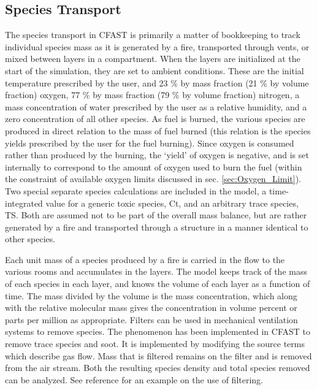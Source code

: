 \subsection{Species Transport}

The species transport in CFAST is primarily a matter of bookkeeping to track individual species mass as it is generated by a fire, transported through vents, or mixed between layers in a compartment.  When the layers are initialized at the start of the simulation, they are set to ambient conditions.  These are the initial temperature prescribed by the user, and 23 \% by mass fraction (21 \% by volume fraction) oxygen, 77 \% by mass fraction (79 \% by volume fraction) nitrogen, a mass concentration of water prescribed by the user as a relative humidity, and a zero concentration of all other species.  As fuel is burned, the various species are produced in direct relation to the mass of fuel burned (this relation is the species yields prescribed by the user for the fuel burning).  Since oxygen is consumed rather than produced by the burning, the `yield' of oxygen is negative, and is set internally to correspond to the amount of oxygen used to burn the fuel (within the constraint of available oxygen limits discussed in sec. \ref{sec:Oxygen_Limit}). Two special separate species calculations are included in the model, a time-integrated value for a generic toxic species, Ct, and an arbitrary trace species, TS.  Both are assumed not to be part of the overall mass balance, but are rather generated by a fire and transported through a structure in a manner identical to other species.

Each unit mass of a species produced by a fire is carried in the flow to the various rooms and accumulates in the layers.  The model keeps track of the mass of each species in each layer, and knows the volume of each layer as a function of time.  The mass divided by the volume is the mass concentration, which along with the relative molecular mass gives the concentration in volume percent or parts per million as appropriate. Filters can be used in mechanical ventilation systems to remove species. The phenomenon has been implemented in CFAST to remove trace species and soot. It is implemented by modifying the source terms which describe gas flow. Mass that is filtered remains on the filter and is removed from the air stream. Both the resulting species density and total species removed can be analyzed. See reference \cite{Jones:2008} for an example on the use of filtering.

